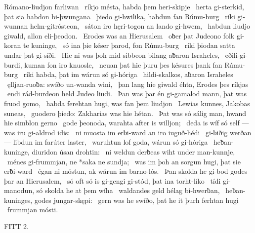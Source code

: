 Rómano-liudjon farliwan \hld\ ríkjo mésta,
habda þem heri-skipje \hld\ herta gi-sterkid,
þat sia habdon bi-þwungana \hld\ þiedo gi-hwilika,
habdun fan Rúmu-burg \hld\ ríki gi-wunnan
helm-gitrósteon, \hld\ sáton iro hęri-togon
an lando gi-hwem, \hld\ habdun liudjo giwald,
allon eli-þeodon. \hld\ Erodes was
an Hierusalem \hld\ oƀer þat Judeono folk
gi-koran te kuninge, \hld\ só ina þie késer þarod,
fon Rúmu-burg \hld\ ríki þiodan
satta undar þat gi-síði. \hld\ Hie ni was þoh mid sibbeon bilang
aƀaron Israheles, \hld\ eðili-gi-burdi,
kuman fon iro knuosle, \hld\ neuan þat hie þuru þes késures þank
fan Rúmu-burg \hld\ ríki habda,
þat im wárun só gi-hóriga \hld\ hildi-skalkos,
aƀaron Israheles \hld\ ęlljan-ruoƀa:
swíðo un-wanda wini, \hld\ þan lang hie giwald éhta,
Erodes þes ríkjas \hld\ endi rád-burdeon held
Judeo liudi. \hld\ Þan was þar én gi-gamalod mann,
þat was fruod gomo, \hld\ habda ferehtan hugi,
was fan þem liudjon \hld\ Lewias kunnes,
Jakobas suneas, \hld\ guodero þiedo:
Zakharias was hie hétan. \hld\ Þat was só sálig man,
hwand hie simblon gerno \hld\ gode þeonoda,
warahta after is willjon; \hld\ deda is wíf só self
— was iru gi-aldrod idis: \hld\ ni muosta im erƀi-ward
an iro iuguð-hédi \hld\ gi-ƀiðig werðan —
libdun im farúter laster, \hld\ waruhtun lof goda,
wárun só gi-hóriga \hld\ heƀan-kuninge,
diuridon úsan drohtin: \hld\ ni weldun derƀeas wiht
under man-kunnje, \hld\ ménes gi-frummjan,
ne *saka ne sundja; \hld\ was im þoh an sorgun hugi,
þat sie erƀi-ward \hld\ égan ni móstun,
ak wárun im barno-lós. \hld\ Þan skolda he gi-bod godes
þar an Hierusalem, \hld\ só oft só is gi-gengi gi-stód,
þat ina torht-líko \hld\ tídi gi-manodun,
só skolda he at þem wíha \hld\ waldandes geld
hélag bi-hwerƀan, \hld\ heƀan-kuninges,
godes jungar-skępi: \hld\ gern was he swíðo,
þat he it þurh ferhtan hugi \hld\ frummjan mósti.

FITT 2.

